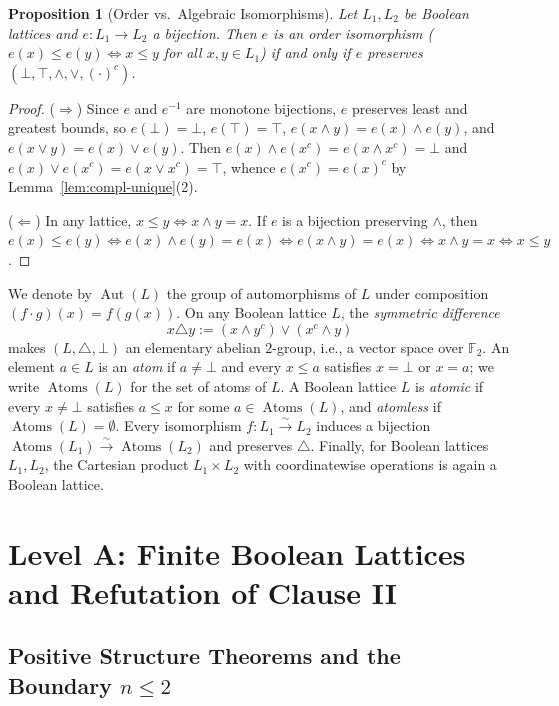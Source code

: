 \documentclass[11pt]{article}
\newtheorem{proposition}[theorem]{Proposition}
\theoremstyle{definition}
\theoremstyle{remark}
\newcommand{\Aut}{\operatorname{Aut}}
\newcommand{\Atoms}{\operatorname{Atoms}}
\newcommand{\Ftwo}{\mathbb{F}_2}
\begin{document}
\begin{proposition}[Order vs.\ Algebraic Isomorphisms]
\label{prop:iso-equiv}
Let $L_1, L_2$ be Boolean lattices and $e : L_1 \to L_2$ a bijection. Then $e$ is an order isomorphism ($e(x) \le e(y) \iff x \le y$ for all $x, y \in L_1$) if and only if $e$ preserves $(\bot, \top, \wedge, \vee, (\cdot)^c)$.
\end{proposition}
\begin{proof}
($\Rightarrow$) Since $e$ and $e^{-1}$ are monotone bijections, $e$ preserves least and greatest bounds, so $e(\bot) = \bot$, $e(\top) = \top$, $e(x \wedge y) = e(x) \wedge e(y)$, and $e(x \vee y) = e(x) \vee e(y)$. Then $e(x) \wedge e(x^c) = e(x \wedge x^c) = \bot$ and $e(x) \vee e(x^c) = e(x \vee x^c) = \top$, whence $e(x^c) = e(x)^c$ by Lemma~\ref{lem:compl-unique}(2).

($\Leftarrow$) In any lattice, $x \le y \iff x \wedge y = x$. If $e$ is a bijection preserving $\wedge$, then $e(x) \le e(y) \iff e(x) \wedge e(y) = e(x) \iff e(x \wedge y) = e(x) \iff x \wedge y = x \iff x \le y$.
\end{proof}

We denote by $\Aut(L)$ the group of automorphisms of $L$ under composition $(f \cdot g)(x) = f(g(x))$. On any Boolean lattice $L$, the \emph{symmetric difference}
\[
  x \triangle y := (x \wedge y^c) \vee (x^c \wedge y)
\]
makes $(L, \triangle, \bot)$ an elementary abelian $2$-group, i.e., a vector space over $\Ftwo$. An element $a \in L$ is an \emph{atom} if $a \neq \bot$ and every $x \le a$ satisfies $x = \bot$ or $x = a$; we write $\Atoms(L)$ for the set of atoms of $L$. A Boolean lattice $L$ is \emph{atomic} if every $x \neq \bot$ satisfies $a \le x$ for some $a \in \Atoms(L)$, and \emph{atomless} if $\Atoms(L) = \emptyset$. Every isomorphism $f : L_1 \xrightarrow{\sim} L_2$ induces a bijection $\Atoms(L_1) \xrightarrow{\sim} \Atoms(L_2)$ and preserves $\triangle$. Finally, for Boolean lattices $L_1, L_2$, the Cartesian product $L_1 \times L_2$ with coordinatewise operations is again a Boolean lattice.

\section{Level A: Finite Boolean Lattices and Refutation of Clause II}

\subsection{Positive Structure Theorems and the Boundary \texorpdfstring{$n \le 2$}{n <= 2}}
\end{document}
